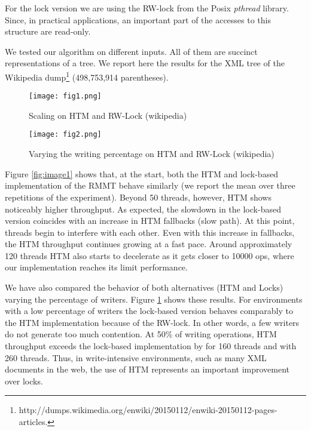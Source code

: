 \documentclass{llncs}
\begin{document}
For the lock version we are using the RW-lock from the Posix {\em pthread} library. Since, in practical applications, an important part of the accesses to this structure are read-only.

We tested our algorithm on different inputs. All of them are succinct representations of a tree. We report here the results for the XML tree of the Wikipedia dump\footnote{http://dumps.wikimedia.org/enwiki/20150112/enwiki-20150112-pages-articles.} (498,753,914 parentheses).

\begin{figure}[t]
  \begin{minipage}{0.48\linewidth}
     \texttt{[image: fig1.png]}
     \caption{Scaling on HTM and RW-Lock (wikipedia)}
     \label{fig:image1}
  \end{minipage}
  \hfill
  \begin{minipage}{0.5\linewidth}
    \hfill
    \texttt{[image: fig2.png]}
    \caption{Varying the writing percentage on HTM and RW-Lock (wikipedia)}
    \label{fig:image2}
  \end{minipage}
  \vspace{-4mm}
\end{figure}

Figure \ref{fig:image1} shows that, at the start, both the HTM and lock-based implementation of the RMMT behave similarly (we report the mean over three repetitions of the experiment). Beyond 50 threads, however, HTM shows noticeably higher throughput. As expected, the slowdown in the lock-based version coincides with an increase in HTM fallbacks (slow path). At this point, threads begin to interfere with each other. Even with this increase in fallbacks, the HTM throughput continues growing at a fast pace. Around approximately 120 threads HTM also starts to decelerate as it gets closer to 10000 ops, where our implementation reaches its limit performance.

We have also compared the behavior of both alternatives (HTM and Locks) varying the percentage of writers. Figure \ref{fig:image2} shows these results. For environments with a low percentage of writers the lock-based version behaves comparably to the HTM implementation because of the RW-lock. In other words, a few writers do not generate too much contention. At 50\% of writing operations, HTM throughput exceeds the lock-based implementation by  for 160 threads and  with 260 threads. Thus, in write-intensive environments, such as many XML documents in the web, the use of HTM represents an important improvement over locks.
\vspace{-2mm}
\end{document}
